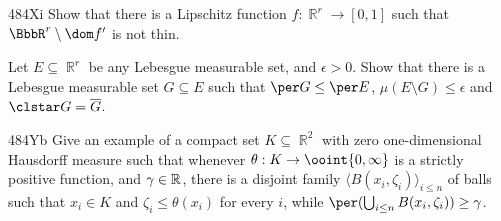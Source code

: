 {\spheader 484Xi Show that there is a Lipschitz function
$f:\BbbR^r\to[0,1]$ such that $\BbbR^r\setminus\dom f'$ is not thin.

Let $E\subseteq\BbbR^r$ be any Lebesgue measurable set, and
$\epsilon>0$.   Show that there is a Lebesgue measurable set
$G\subseteq E$ such that $\per G\le\per E$,
$\mu(E\setminus G)\le\epsilon$ and $\clstar G=\overline{G}$.

\spheader 484Yb
Give an example of a compact set $K\subseteq\BbbR^2$
with zero one-dimensional Hausdorff measure such that whenever
$\theta:K\to\ooint{0,\infty}$ is a strictly positive function, and
$\gamma\in\Bbb R$, there is a disjoint family
$\langle B(x_i,\zeta_i)\rangle_{i\le n}$ of balls such that $x_i\in K$
and $\zeta_i\le\theta(x_i)$ for every $i$, while
$\per(\bigcup_{i\le n}B(x_i,\zeta_i))\ge\gamma$.
}%

